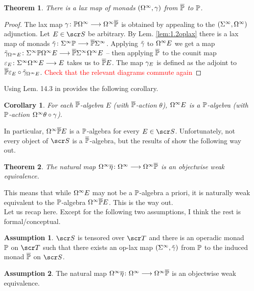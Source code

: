 \documentclass{amsart}
\newtheorem{thm}{Theorem}[section]
\newtheorem{cor}{Corollary}[thm]
\theoremstyle{definition}
\newtheorem{assn}{Assumption}[section]
\begin{document}
\begin{thm}
There is a lax map of monads $(\Omega^{\infty},\gamma)$ from $\overline{\mathbb{P}}$ to $\mathbb{P}$. 
\end{thm}
\begin{proof}
The lax map $\gamma \colon \mathbb{P} \Omega^{\infty} \longrightarrow \Omega^{\infty} \overline{\mathbb{P}}$ is obtained by appealing to the $(\Sigma^{\infty},\Omega^{\infty})$ adjunction. Let $E \in \sS$ be arbitrary. By Lem. \ref{lem:1.2oplax} there is a lax map of monads $\tilde{\gamma} \colon \Sigma^{\infty}\mathbb{P} \longrightarrow \overline{\mathbb{P}} \Sigma^{\infty}$. Applying $\tilde{\gamma}$ to $\Omega^{\infty}E$ we get a map $\tilde{\gamma}_{\Omega^{\infty}E} \colon \Sigma^{\infty} \mathbb{P} \Omega^{\infty}E\longrightarrow \overline{\mathbb{P}} \Sigma^{\infty} \Omega^{\infty} E$ -- then applying $\overline{\mathbb{P}}$ to the counit map $\varepsilon_E \colon \Sigma^{\infty} \Omega^{\infty}E \longrightarrow E$ takes us to $\overline{\mathbb{P}} E$. The map $\gamma_E$ is defined as the adjoint to $\overline{\mathbb{P}} \varepsilon_E \circ \tilde{\gamma}_{\Omega^{\infty}E}$. \textcolor{red}{Check that the relevant diagrams commute again}
\end{proof}

Using Lem. 14.3 in \cite{May09Einfty} provides the following corollary.

\begin{cor}\label{cor:1.1.1}
For each $\overline{\mathbb{P}}$-algebra $E$ (with $\overline{\mathbb{P}}$-action $\theta$), $\Omega^{\infty}E$ is a $\mathbb{P}$-algebra (with $\mathbb{P}$-action $\Omega^{\infty} \theta \circ \gamma$). 
\end{cor}

\noindent In particular, $\Omega^{\infty}\overline{\mathbb{P}} E$ is a $\mathbb{P}$-algebra for every $E \in \sS$. Unfortunately, not every object of $\sS$ is a $\overline{\mathbb{P}}$-algebra, but the results of \cite{Barratt1974oper} show the following way out.

\begin{thm}
The natural map $\Omega^{\infty} \overline{\eta} \colon \Omega^{\infty} \longrightarrow \Omega^{\infty} \overline{\mathbb{P}}$ is an objectwise weak equivalence. 
\end{thm}

\noindent This means that while $\Omega^{\infty}E$ may not be a $\mathbb{P}$-algebra a priori, it is naturally weak equivalent to the $\mathbb{P}$-algebra $\Omega^{\infty} \overline{\mathbb{P}}E$. This is the way out.\\

Let us recap here. Except for the following two assumptions, I think the rest is formal/conceptual.

\begin{assn}\label{ass:1.1}
$\sS$ is tensored over $\sT$ and there is an operadic monad $\mathbb{P}$ on $\sT$ such that there exists an op-lax map $(\Sigma^{\infty}, \tilde{\gamma})$ from $\mathbb{P}$ to the induced monad $\overline{\mathbb{P}}$ on $\sS$.
\end{assn}
\begin{assn}\label{ass:1.2}
The natural map $\Omega^{\infty}\overline{\eta} \colon \Omega^{\infty} \longrightarrow \Omega^{\infty} \overline{\mathbb{P}}$ is an objectwise weak equivalence.
\end{assn}
\end{document}
